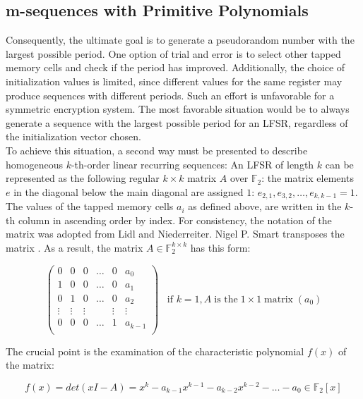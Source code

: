 \pagebreak

\subsection{m-sequences with Primitive Polynomials}
Consequently, the ultimate goal is to generate a pseudorandom number with the largest possible period. One option of trial and error is to select other tapped memory cells and check if the period has improved. Additionally, the choice of initialization values is limited, since different values for the same register may produce sequences with different periods. Such an effort is unfavorable for a symmetric encryption system. The most favorable situation would be to always generate a sequence with the largest possible period for an LFSR, regardless of the initialization vector chosen.\\

To achieve this situation, a second way must be presented to describe homogeneous $k$-th-order linear recurring sequences: An LFSR of length $k$ can be represented as the following regular $k\times{k}$ matrix $A$ over $\mathbb{F}_2$: the matrix elements $e$ in the diagonal below the main diagonal are assigned $1$: $e_{2,1},e_{3,2},\ldots,e_{k,k-1}=1$. The values of the tapped memory cells $a_i$ as defined above, are written in the $k$-th column in ascending order by index. \cite[p. 191]{Lidl.1986} For consistency, the notation of the matrix was adopted from Lidl and Niederreiter. Nigel P. Smart transposes the matrix \cite[p. 218]{Smart.2016}. As a result, the matrix $A\in \mathbb{F}_2^{k\times{k}}$ has this form:

\begin{equation*}
	\begin{pmatrix}
		0&0&0&\ldots&0&a_0\\
		1&0&0&\ldots&0&a_1\\
		0&1&0&\ldots&0&a_2\\
		\vdots&\vdots&\vdots&\ &\vdots&\vdots\\
		0&0&0&\ldots&1&a_{k-1}\\
	\end{pmatrix}
	\;\;\;\text{if }k=1,A\;\text{is the}\; 1 \times 1\;\text{matrix}\; (a_0)
\end{equation*}

The crucial point is the examination of the characteristic polynomial $f(x)$ of the matrix: 

\begin{equation*}
	f(x)=det(xI-A)=x^k-a_{k-1}x^{k-1}-a_{k-2}x^{k-2}-\ldots-a_0\in\mathbb{F}_2[x]
\end{equation*}

